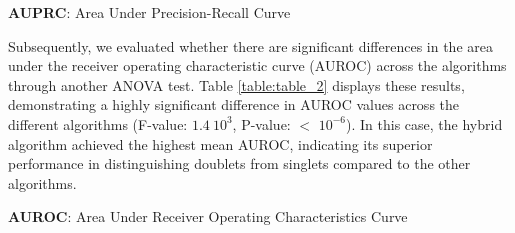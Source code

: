 \documentclass[11pt]{article}
\begin{document}
\begin{table}[h]
\caption{\protect\hyperlink{file-table-1-pkl}{ANOVA results comparing Area Under Precision-Recall Curve (AUPRC) across algorithms}}
\label{table:table_1}
\begin{threeparttable}
\renewcommand{\TPTminimum}{\linewidth}
\begin{tablenotes}
\footnotesize
\item \textbf{AUPRC}: Area Under Precision-Recall Curve
\end{tablenotes}
\end{threeparttable}
\end{table}

Subsequently, we evaluated whether there are significant differences in the area under the receiver operating characteristic curve (AUROC) across the algorithms through another ANOVA test. Table \ref{table:table_2} displays these results, demonstrating a highly significant difference in AUROC values across the different algorithms (F-value: \hyperlink{C0a}{$1.4\ 10^{3}$}, P-value: $<$ \hyperlink{C0b}{$10^{-6}$}). In this case, the hybrid algorithm achieved the highest mean AUROC, indicating its superior performance in distinguishing doublets from singlets compared to the other algorithms.

\begin{table}[h]
\caption{\protect\hyperlink{file-table-2-pkl}{ANOVA results comparing Area Under Receiver Operating Characteristic (AUROC) across algorithms}}
\label{table:table_2}
\begin{threeparttable}
\renewcommand{\TPTminimum}{\linewidth}
\begin{tablenotes}
\footnotesize
\item \textbf{AUROC}: Area Under Receiver Operating Characteristics Curve
\end{tablenotes}
\end{threeparttable}
\end{table}
\end{document}
